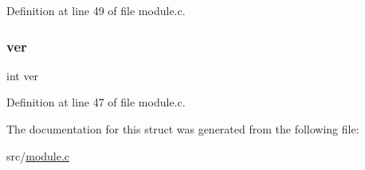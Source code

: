 Definition at line 49 of file module.\+c.

\mbox{\label{struct_redis_module_a88ca8dd6d8b1535e6ba06c4d988c525b}} 
\subsubsection{\texorpdfstring{ver}{ver}}
{\footnotesize\ttfamily int ver}



Definition at line 47 of file module.\+c.



The documentation for this struct was generated from the following file\+:\begin{DoxyCompactItemize}
\item 
src/\hyperlink{module_8c}{module.\+c}\end{DoxyCompactItemize}
